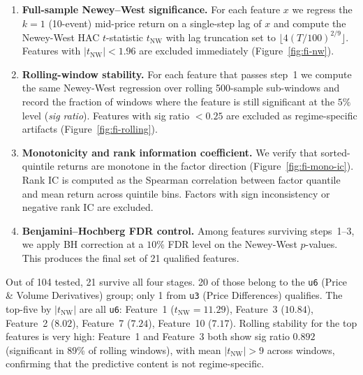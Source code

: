 \documentclass[11pt]{article}
\begin{document}
\begin{enumerate}[leftmargin=*]
    \item \textbf{Full-sample Newey--West significance.} For each feature $x$ we regress the $k{=}1$ (10-event) mid-price return on a single-step lag of $x$ and compute the Newey-West HAC $t$-statistic $t_\text{NW}$ with lag truncation set to $\lfloor 4(T/100)^{2/9}\rfloor$. Features with $|t_\text{NW}|{<}1.96$ are excluded immediately (Figure~\ref{fig:fi-nw}).

    \item \textbf{Rolling-window stability.} For each feature that passes step~1 we compute the same Newey-West regression over rolling 500-sample sub-windows and record the fraction of windows where the feature is still significant at the $5\%$ level (\emph{sig ratio}). Features with sig ratio ${<}0.25$ are excluded as regime-specific artifacts (Figure~\ref{fig:fi-rolling}).

    \item \textbf{Monotonicity and rank information coefficient.} We verify that sorted-quintile returns are monotone in the factor direction (Figure~\ref{fig:fi-mono-ic}). Rank IC is computed as the Spearman correlation between factor quantile and mean return across quintile bins. Factors with sign inconsistency or negative rank IC are excluded.

    \item \textbf{Benjamini--Hochberg FDR control.} Among features surviving steps~1--3, we apply BH correction at a $10\%$ FDR level on the Newey-West $p$-values. This produces the final set of 21 qualified features.
\end{enumerate}

Out of 104 tested, 21 survive all four stages. 20 of those belong to the \texttt{u6} (Price \& Volume Derivatives) group; only 1 from \texttt{u3} (Price Differences) qualifies. The top-five by $|t_\text{NW}|$ are all \texttt{u6}: Feature~1 ($t_\text{NW}{=}11.29$), Feature~3 ($10.84$), Feature~2 ($8.02$), Feature~7 ($7.24$), Feature~10 ($7.17$). Rolling stability for the top features is very high: Feature~1 and Feature~3 both show sig ratio $0.892$ (significant in 89\% of rolling windows), with mean $|t_\text{NW}|{>}9$ across windows, confirming that the predictive content is not regime-specific.
\end{document}
